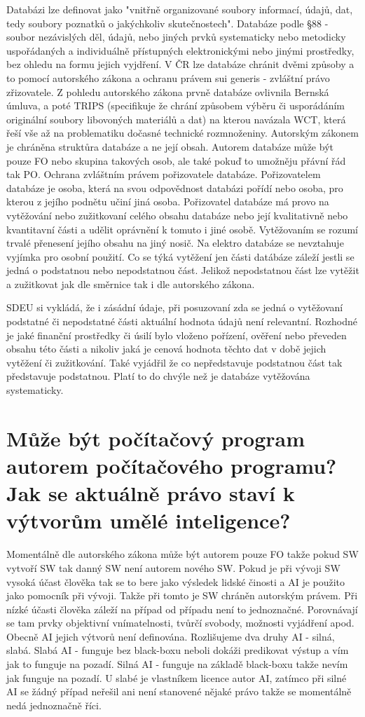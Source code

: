\documentclass[12pt,a4paper,czech]{article}
\newcommand{\nadpis}[1]{{\section{#1}}}
\begin{document}
Databázi lze definovat jako "vnitřně organizované soubory informací, údajů, dat, tedy soubory poznatků o jakýchkoliv skutečnostech".
Databáze podle §88 - soubor nezávislých děl, údajů, nebo jiných prvků systematicky nebo metodicky uspořádaných a individuálně přístupných elektronickými nebo jinými prostředky, bez ohledu na formu jejich vyjdření.
V ČR lze databáze chránit dvěmi způsoby a to pomocí autorského zákona a ochranu právem sui generis - zvláštní právo zřizovatele.
Z pohledu autorského zákona prvně databáze ovlivnila Bernská úmluva, a poté TRIPS (specifikuje že chrání způsobem výběru či usporádáním originální soubory libovoných materiálů a dat) na kterou navázala WCT, která řeší vše až na problematiku dočasné technické rozmnoženiny. Autorským zákonem je chráněna struktůra databáze a ne její obsah.
Autorem databáze může být pouze FO nebo skupina takových osob, ale také pokuď to umožněju přávní řád tak PO.
Ochrana zvláštním právem pořizovatele databáze. Pořizovatelem databáze je osoba, která na svou odpovědnost databázi pořídí nebo osoba, pro kterou z jejího podnětu učiní jiná osoba. Pořizovatel databáze má provo na vytěžování nebo zužitkovaní celého obsahu databáze nebo její kvalitativně nebo kvantitavní části a udělit oprávnění k tomuto i jiné osobě. Vytěžovaním se rozumí trvalé přenesení jejího obsahu na jiný nosič. Na elektro databáze se nevztahuje vyjímka pro osobní použití. Co se týká vytěžení jen části datábáze záleží jestli se jedná o podstatnou nebo nepodstatnou část. Jelikož nepodstatnou část lze vytěžit a zužitkovat jak dle směrnice tak i dle autorského zákona.

SDEU si vykládá, že i zásádní údaje, při posuzovaní zda se jedná o vytěžovaní podstatné či nepodstatné části aktuální hodnota údajů není relevantní. Rozhodné je jaké finanční prostředky či úsilí bylo vloženo pořízení, ověření nebo převeden obsahu této části a nikoliv jaká je cenová hodnota těchto dat v době jejich vytěžení či zužitkování. Také vyjádřil že co nepředstavuje podstatnou část tak představuje podstatnou. Platí to do chvýle než je databáze vytěžována systematicky.

\vspace{0.5cm} 
\nadpis{Může být počítačový program autorem počítačového programu? Jak se aktuálně právo staví k výtvorům umělé inteligence?}

Momentálně dle autorského zákona může být autorem pouze FO takže pokud SW vytvoří SW tak danný SW není autorem nového SW. Pokud je při vývoji SW vysoká účast člověka tak se to bere jako výsledek lidské činosti a AI je použito jako pomocník při vývoji. Takže při tomto je SW chráněn autorským právem. Při nízké účasti člověka záleží na případ od případu není to jednoznačné. Porovnávají se tam prvky objektivní vnímatelnosti, tvůrčí svobody, možnosti vyjádření apod. Obecně AI jejich výtvorů není definována. Rozlišujeme dva druhy AI - silná, slabá. Slabá AI - funguje bez black-boxu neboli dokáži predikovat výstup a vím jak to funguje na pozadí. Silná AI - funguje na základě black-boxu takže nevím jak funguje na pozadí. U slabé je vlastníkem licence autor AI, zatímco při silné AI se žádný případ neřešil ani není stanovené nějaké právo takže se momentálně nedá jednoznačně říci.
\end{document}
